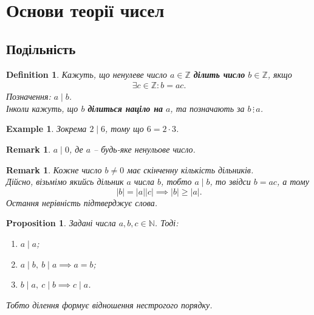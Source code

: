 \documentclass[a4paper, 10pt]{article}
\theoremstyle{theoremdd}
\theoremstyle{theoremdd}
\newtheorem{definition}[theorem]{Definition}
\theoremstyle{theoremdd}
\theoremstyle{theoremdd}
\newtheorem{example}[theorem]{Example}
\theoremstyle{theoremdd}
\newtheorem{proposition}[theorem]{Proposition}
\theoremstyle{theoremdd}
\newtheorem{remark}[theorem]{Remark}
\theoremstyle{theoremdd}
\theoremstyle{theoremdd}
\begin{document}

\tableofcontents
\newpage

\section{Основи теорії чисел}
\subsection{Подільність}
\begin{definition}
Кажуть, що ненулеве число $a \in \mathbb{Z}$ \textbf{ділить число} $b \in \mathbb{Z}$, якщо
\begin{align*}
\exists c \in \mathbb{Z}: b = ac.
\end{align*}
Позначення: $a \mid b$.\\
Інколи кажуть, що $b$ \textbf{ділиться націло на} $a$, та позначають за $b \, \vdots \, a$.
\end{definition}

\begin{example}
Зокрема $2 \mid 6$, тому що $6 = 2 \cdot 3$.
\end{example}

\begin{remark}
$a \mid 0$, де $a$ -- будь-яке ненульове число.
\end{remark}

\begin{remark}
Кожне число $b \neq 0$ має скінченну кількість дільників.\\
Дійсно, візьмімо якийсь дільник $a$ числа $b$, тобто $a \mid b$, то звідси $b = ac$, а тому 
\[
|b| = |a||c| \implies |b| \geq |a|.
\]
Остання нерівність підтверджує слова.
\end{remark}

\begin{proposition}
Задані числа $a,b,c \in \mathbb{N}$. Тоді:
\begin{enumerate}[nosep,wide=0pt,label={\arabic*)}]
\item $a \mid a$;
\item $a \mid b,\ b \mid a \implies a = b$;
\item $b \mid a,\ c \mid b \implies c \mid a$.   
\end{enumerate}
Тобто ділення формує відношення нестрогого порядку.
\end{proposition}
\end{document}
